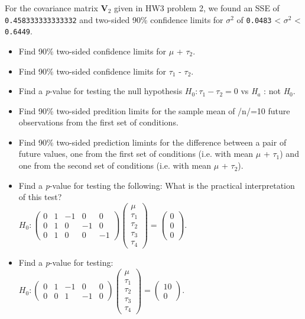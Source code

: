 \documentclass[11pt]{article}
\begin{document}
For the covariance matrix \textbf{V$_2$} given in HW3 problem 2, we found an
SSE of \texttt{0.458333333333332} and two-sided 90\% confidence
limits for $\sigma$$^2$ of \texttt{0.0483} <
$\sigma$$^2$ < \texttt{0.6449}.
\begin{itemize}

\item Find 90\% two-sided confidence limits for $\mu$ + $\tau$$_2$.
\label{sec-1-1-3-1}%


\item Find 90\% two-sided confidence limits for $\tau$$_1$ - $\tau$$_2$.
\label{sec-1-1-3-2}%


\item Find a \emph{p}-value for testing the null hypothesis $H_0 : \tau_1 - \tau_2 = 0$ vs \emph{H$_a$} : not \emph{H$_0$}.
\label{sec-1-1-3-3}%


\item Find 90\% two-sided predition limits for the sample mean of /n/=10 future observations from the first set of conditions.
\label{sec-1-1-3-4}%


\item Find 90\% two-sided prediction limints for the difference between a pair of future values, one from the first set of conditions (i.e. with mean $\mu$ + $\tau$$_1$) and one from the second set of conditions (i.e. with mean $\mu$ + $\tau$$_2$).
\label{sec-1-1-3-5}%


\item Find a \emph{p}-value for testing the following: What is the practical interpretation of this test?\\
\label{sec-1-1-3-6}%
\( H_0 : \begin{pmatrix} 0 & 1 & -1 & 0 & 0 \\ 0 & 1 & 0 & -1 & 0 \\ 0 & 1 & 0 & 0 & -1 \end{pmatrix} \begin{pmatrix} \mu \\ \tau_1 \\ \tau_2 \\ \tau_3 \\ \tau_4 \end{pmatrix} = \begin{pmatrix} 0 \\ 0 \\ 0 \end{pmatrix}. \) 

\item Find a \emph{p}-value for testing:\\
\label{sec-1-1-3-7}%
\(H_0 : \begin{pmatrix} 0 & 1 & -1 & 0 & 0 \\ 0 & 0 & 1 & -1 & 0 \end{pmatrix} \begin{pmatrix} \mu \\ \tau_1 \\ \tau_2 \\ \tau_3 \\ \tau_4 \end{pmatrix} = \begin{pmatrix} 10 \\ 0  \end{pmatrix}.\)
\end{itemize} %
\end{document}
